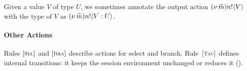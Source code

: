 \begin{notation}
Given a value $V$ of type $U$, we sometimes annotate the output action 
$(\nu\, \widetilde{m}) n ! \langle V \rangle$
with the type of $V$ 
as $(\nu\, \widetilde{m}) n ! \langle V : U \rangle$.
\end{notation}

\paragraph{Other Actions}
Rules ${[\text{\footnotesize \textsc{Sel}}]}$ and ${[\text{\footnotesize \textsc{Bra}}]}$ describe actions for
select and branch.
Rule~${[\text{\footnotesize \textsc{Tau}}]}$ defines
internal transitions: 
it keeps the session environment unchanged or 
reduces it ().

